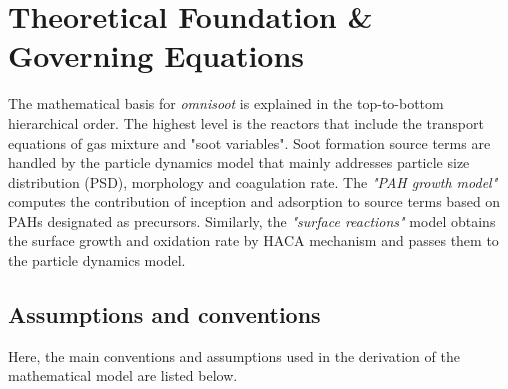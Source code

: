 \section{Theoretical Foundation \& Governing Equations}
The mathematical basis for \textit{omnisoot} is explained in the top-to-bottom hierarchical order. The highest level is the reactors that include the transport equations of gas mixture and "soot variables". Soot formation source terms are handled by the particle dynamics model that mainly addresses particle size distribution (PSD), morphology and coagulation rate. The \textit{"PAH growth model"} computes the contribution of inception and adsorption to source terms based on PAHs designated as precursors. Similarly, the \textit{"surface reactions"} model obtains the surface growth and oxidation rate by HACA mechanism and passes them to the particle dynamics model. 

\subsection{Assumptions and conventions}
Here, the main conventions and assumptions used in the derivation of the mathematical model are listed below.

